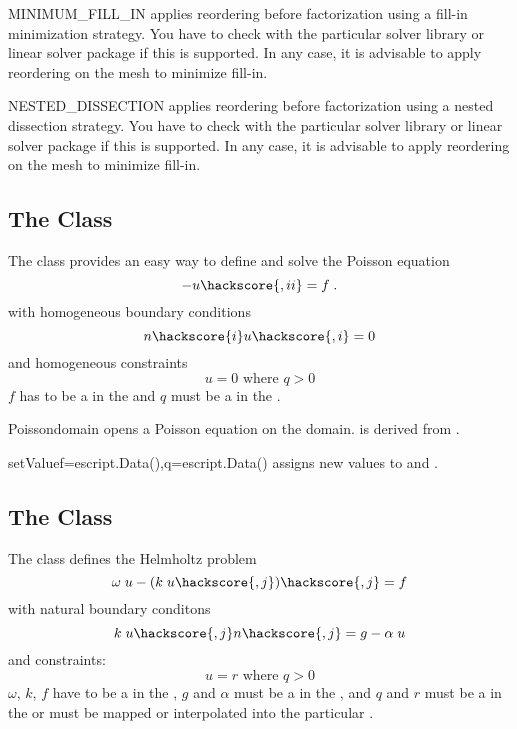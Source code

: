 \begin{memberdesc}[LinearPDE]{MINIMUM_FILL_IN}
applies reordering before factorization using a fill-in minimization strategy. You have to check with the particular solver library or
linear solver package if this is supported. In any case, it is advisable to apply reordering on the mesh to minimize fill-in.
\end{memberdesc}

\begin{memberdesc}[LinearPDE]{NESTED_DISSECTION}
applies reordering before factorization using a nested dissection strategy. You have to check with the particular solver library or
linear solver package if this is supported. In any case, it is advisable to apply reordering on the mesh to minimize fill-in.
\end{memberdesc}

\subsection{The \Poisson Class}
The \Poisson class provides an easy way to define and solve the Poisson
equation
\begin{equation}\label{POISSON.1}
-u\hackscore{,ii}=f\; .
\end{equation}
with homogeneous boundary conditions
\begin{equation}\label{POISSON.2}
n\hackscore{i}u\hackscore{,i}=0
\end{equation}
and homogeneous constraints
\begin{equation}\label{POISSON.3}
u=0 \mbox{ where } q>0
\end{equation}
$f$ has to be a \Scalar in the \Function and $q$ must be
a \Scalar in  the \SolutionFS.

\begin{classdesc}{Poisson}{domain}
opens a Poisson equation on the \Domain domain. \Poisson is derived from \LinearPDE.
\end{classdesc}
\begin{methoddesc}[Poisson]{setValue}{f=escript.Data(),q=escript.Data()}
assigns new values to  and .
\end{methoddesc}

\subsection{The \Helmholtz Class}
The \Helmholtz class defines the Helmholtz problem
\begin{equation}\label{HZ.1}
\omega \; u - (k\; u\hackscore{,j})\hackscore{,j} = f
\end{equation}
 with natural boundary conditons
\begin{equation}\label{HZ.2}
k\; u\hackscore{,j} n\hackscore{,j} = g- \alpha \; u 
\end{equation}
and constraints:
\begin{equation}\label{HZ.3}
u=r \mbox{ where } q>0
\end{equation}
$\omega$, $k$, $f$ have to be a \Scalar in the \Function,
$g$ and $\alpha$ must be a \Scalar in  the \FunctionOnBoundary,
and $q$ and $r$ must be a \Scalar in  the \SolutionFS or must be mapped or interpolated into the particular \FunctionSpace.

